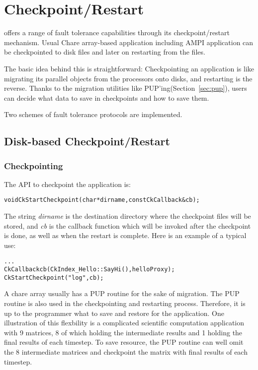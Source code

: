 \section{Checkpoint/Restart}
\label{sec:checkpoint}

\charmpp{} offers a range of fault tolerance capabilities through its 
checkpoint/restart mechanism. Usual Chare array-based \charmpp{} application 
including AMPI application can be checkpointed to disk files and later 
on restarting from the files.

The basic idea behind this is straightforward: Checkpointing an 
application is like migrating its parallel objects from the processors
onto disks, and restarting is the reverse. Thanks to the migration 
utilities like PUP'ing(Section~\ref{sec:pup}), users can decide what 
data to save in checkpoints and how to save them.

Two schemes of fault tolerance protocols are implemented.

\subsection{Disk-based Checkpoint/Restart}

\subsubsection{Checkpointing}
\label{sec:diskcheckpoint}
	The API to checkpoint the application is:

\begin{alltt} 
  void CkStartCheckpoint(char* dirname,const CkCallback& cb);
\end{alltt}

The string {\it dirname} is the destination directory where the checkpoint
files will be stored, and {\it cb} is the callback function which will be
invoked after the checkpoint is done, as well as when the restart is
complete. Here is an example of a typical use:

\begin{alltt} 
  . . .
  CkCallback cb(CkIndex_Hello::SayHi(),helloProxy);
  CkStartCheckpoint("log",cb);
\end{alltt}

A chare array usually has a PUP routine for the sake of migration. 
The PUP routine is also used in the checkpointing and restarting process.
Therefore, it is up to the programmer what to save and restore for
the application. One illustration of this flexbility is a complicated
scientific computation application with 9 matrices, 8 of which holding 
the intermediate results and 1 holding the final results of each timestep.
To save resource, the PUP routine can well omit the 8 intermediate matrices
and checkpoint the matrix with final results of each timestep. 

